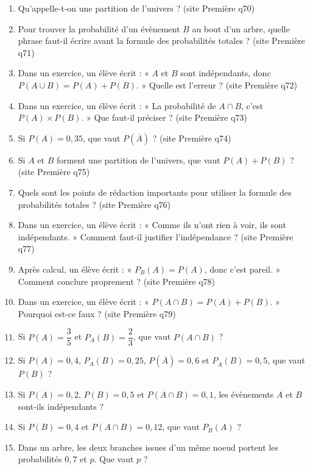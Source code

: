 \documentclass[11pt,a4paper]{article}
\newcommand{\sourceq}[1]{ {\scriptsize\textcolor{bleufonce}{(site Première q#1)}}}
\newcounter{question}
\newenvironment{blocquestions}[1]{%
  \begin{tcolorbox}[enhanced,breakable,colback=bleuclair,colframe=bleufonce,boxrule=0.6pt,arc=2mm,left=2mm,right=2mm,top=2mm,bottom=1.5mm,title={\bfseries #1},coltitle=white,colbacktitle=bleufonce,before skip=3mm,after skip=3mm, fontupper=\large]
  \large
  \begin{enumerate}[leftmargin=*,label=\textbf{\arabic*.},itemsep=0.85em,topsep=0.5em]
  \setcounter{enumi}{\value{question}}
}{%
  \setcounter{question}{\value{enumi}}
  \end{enumerate}
  \end{tcolorbox}
}
\begin{document}
\begin{blocquestions}{Questions flash -- Probabilités conditionnelles}
  \item Qu'appelle-t-on une partition de l'univers ? \sourceq{70}
  \item Pour trouver la probabilité d'un évènement $B$ au bout d'un arbre, quelle phrase faut-il écrire avant la formule des probabilités totales ? \sourceq{71}
  \item Dans un exercice, un élève écrit : « $A$ et $B$ sont indépendants, donc $P(A\cup B)=P(A)+P(B)$. » Quelle est l'erreur ? \sourceq{72}
  \item Dans un exercice, un élève écrit : « La probabilité de $A\cap B$, c'est $P(A)\times P(B)$. » Que faut-il préciser ? \sourceq{73}
  \item Si $P(A)=0{,}35$, que vaut $P(\overline A)$ ? \sourceq{74}
  \item Si $A$ et $B$ forment une partition de l'univers, que vaut $P(A)+P(B)$ ? \sourceq{75}
  \item Quels sont les points de rédaction importants pour utiliser la formule des probabilités totales ? \sourceq{76}
  \item Dans un exercice, un élève écrit : « Comme ils n'ont rien à voir, ils sont indépendants. » Comment faut-il justifier l'indépendance ? \sourceq{77}
  \item Après calcul, un élève écrit : « $P_B(A)=P(A)$, donc c'est pareil. » Comment conclure proprement ? \sourceq{78}
  \item Dans un exercice, un élève écrit : « $P(A\cap B)=P(A)+P(B)$. » Pourquoi est-ce faux ? \sourceq{79}
  \item Si $P(A)=\dfrac{3}{5}$ et $P_A(B)=\dfrac{2}{3}$, que vaut $P(A\cap B)$ ?
  \item Si $P(A)=0{,}4$, $P_A(B)=0{,}25$, $P(\overline A)=0{,}6$ et $P_{\overline A}(B)=0{,}5$, que vaut $P(B)$ ?
  \item Si $P(A)=0{,}2$, $P(B)=0{,}5$ et $P(A\cap B)=0{,}1$, les évènements $A$ et $B$ sont-ils indépendants ?
  \item Si $P(B)=0{,}4$ et $P(A\cap B)=0{,}12$, que vaut $P_B(A)$ ?
  \item Dans un arbre, les deux branches issues d'un même noeud portent les probabilités $0{,}7$ et $p$. Que vaut $p$ ?
\end{blocquestions}
\clearpage
\end{document}
